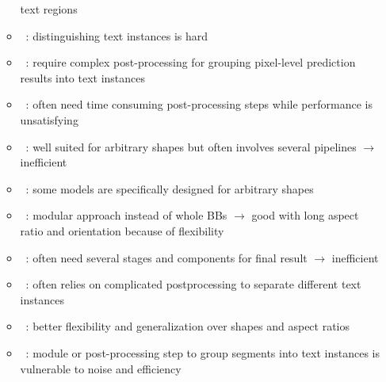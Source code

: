 \begin{itemize}
\begin{itemize}
                text regions
            \item~\cite{wang_shape_2019}: distinguishing text instances is hard
            \item~\cite{liao_real-time_2019}: require complex post-processing for grouping
                pixel-level prediction results into text instances
            \item~\cite{xie_aggregation_2019}: often need time consuming post-processing steps
                while performance is unsatisfying
            \item~\cite{dai_fused_2018}: well suited for arbitrary shapes but often involves several
                pipelines $\rightarrow$ inefficient
            \item~\cite{ferrari_textsnake_2018}: some models are specifically designed for
                arbitrary shapes
            \item~\cite{shi_detecting_2017}: modular approach instead of whole \acp{BB}
                $\rightarrow$ good with long aspect ratio and orientation because of flexibility
            \item~\cite{dai_fused_2018}: often need several stages and components for final result
                $\rightarrow$ inefficient
            \item~\cite{qiao_text_2021}: often relies on complicated postprocessing to separate
                different text instances
            \item~\cite{long_scene_2021}: better flexibility and generalization over shapes and
                aspect ratios
            \item~\cite{long_scene_2021}: module or post-processing step to group segments
                into text instances is vulnerable to noise and efficiency
        \end{itemize}
\end{itemize}

